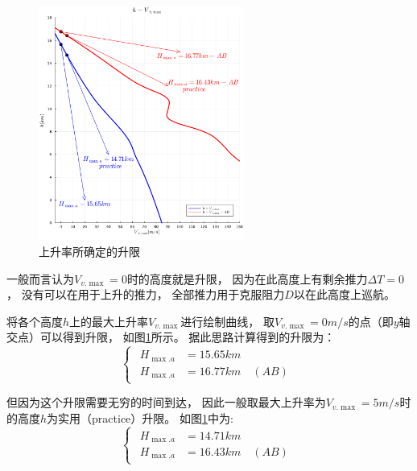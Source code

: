 \begin{figure}[H]
    \centering
    \includegraphics[width=0.6\textwidth]{image/ch5/Vvmax_H.pdf}
    \caption{上升率所确定的升限}
    \label{上升率所确定的升限}
\end{figure}

一般而言认为$V_{v.\max}=0$时的高度就是升限，
因为在此高度上有剩余推力$\Delta T=0$，
没有可以在用于上升的推力，
全部推力用于克服阻力$D$以在此高度上巡航。

将各个高度$h$上的最大上升率$V_{v.\max}$进行绘制曲线，
取$V_{v.\max}=0m/s$的点（即$y$轴交点）可以得到升限，
如图\ref{上升率所确定的升限}所示。
据此思路计算得到的升限为：
\begin{equation}
    \begin{cases}
        \begin{aligned}
            H_{\max .a} & = 15.65km\\
            H_{\max .a} & = 16.77km\quad (AB) 
        \end{aligned}
    \end{cases}
\end{equation}

但因为这个升限需要无穷的时间到达，
因此一般取最大上升率为$V_{v.\max}=5m/s$时的高度$h$为实用（practice）升限。
如图\ref{上升率所确定的升限}中为:
\begin{equation}
    \begin{cases}
        \begin{aligned}
            H_{\max .a} & = 14.71km\\
            H_{\max .a} & = 16.43km\quad (AB) 
        \end{aligned}
    \end{cases}
\end{equation}



